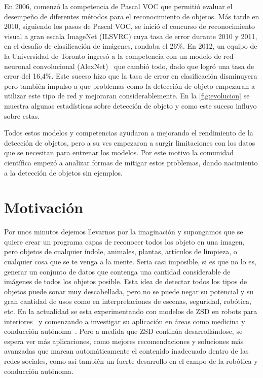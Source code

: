 En 2006, comenzó la competencia de Pascal VOC que permitió evaluar el desempeño de diferentes métodos para el reconocimiento de objetos. Más tarde en 2010, siguiendo los pasos de Pascal VOC, se inició el concurso de reconocimiento visual a gran escala ImageNet (ILSVRC) cuya tasa de error durante 2010 y 2011, en el desafío de clasificación de imágenes, rondaba el 26\%.  En 2012, un equipo de la Universidad de Toronto ingresó a la competencia con un modelo de red neuronal convolucional (AlexNet)~\cite{krizhevsky2012imagenet} que cambió todo, dado que logró una tasa de error del 16,4\%. Este suceso hizo que la tasa de error en clasificación disminuyera pero también impulso a que problemas como la detección de objeto empezaran a utilizar este tipo de red y mejoraran considerablemente. En la \autoref{fig:evolucion} se muestra algunas estadísticas sobre detección de objeto y como este suceso influyo sobre estas.

Todos estos modelos y competencias ayudaron a mejorando el rendimiento de la detección de objetos, pero a su ves empezaron a surgir limitaciones con los datos que se necesitan para entrenar los modelos. Por este motivo la comunidad científica empezó a analizar formas de mitigar estos problemas, dando nacimiento a la detección de objetos sin ejemplos.


\section{Motivación} \label{sec:motivacion}

Por unos minutos dejemos llevarnos por la imaginación y supongamos que se quiere crear un programa capas de reconocer todos los objeto en una imagen, pero objetos de cualquier índole, animales, plantas, artículos de limpieza, o cualquier cosa que se te venga a la mente. Seria casi imposible, si es que no lo es, generar un conjunto de datos que contenga una cantidad considerable de imágenes de todos los objetos posible. Esta idea de detectar todos los tipos de objetos puede sonar muy descabellada, pero no se puede negar su potencial y su gran cantidad de usos como en interpretaciones de escenas, seguridad, robótica, etc. En la actualidad se esta experimentando con modelos de ZSD en robots para interiores~\cite{abdalwhab2019zero} y comenzando a investigar su aplicación en áreas como medicina y conducción autónoma~\cite{rezaei2020zero}. Pero a medida que ZSD continúa desarrollándose, se espera ver más aplicaciones, como mejores recomendaciones y soluciones más avanzadas que marcan automáticamente el contenido inadecuado dentro de las redes sociales, como así también un fuerte desarrollo en el campo de la robótica y conducción autónoma.


